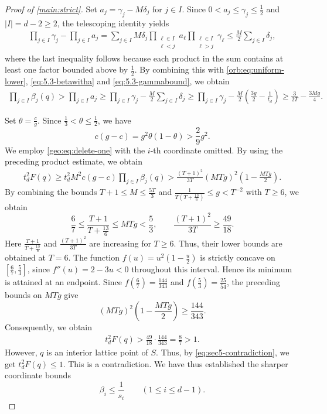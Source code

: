 \documentclass[reqno, 11pt]{article}
\numberwithin{equation}{section}
\theoremstyle{definition}
\begin{document}
\begin{proof}[Proof of \cref{main:strict}]
Set $a_j=\gamma_j-M\delta_j$ for $j\in I$. Since $0<a_j\le\gamma_j\le\frac12$ and $|I|=d-2\ge2$, the telescoping identity yields
\[
\begin{aligned}
\prod_{j\in I}\gamma_j-\prod_{j\in I}a_j=\sum_{j\in I}M\delta_j
\prod_{\substack{\ell\in I\\\ell<j}}a_\ell
\prod_{\substack{\ell\in I\\\ell>j}}\gamma_\ell\le\frac M2\sum_{j\in I}\delta_j,
\end{aligned}
\]
where the last inequality follows because each product in the sum contains at least one factor bounded above by $\frac12$. 
By combining this with \eqref{orb:eq:uniform-lower}, \eqref{eq:5.3-betawitha} and \eqref{eq:5.3-gammabound}, we obtain
\[
\begin{aligned}
\prod_{j\in I}\beta_j(q)>\prod_{j\in I}a_j\ge\prod_{j\in I}\gamma_j-\frac M2\sum_{j\in I}\delta_j
\ge\prod_{j\in I}\gamma_j
-\frac M2\left(\frac{3g}{2}-\frac1{t_d}\right)
\ge\frac3{2T}-\frac{3Mg}{4}.
\end{aligned}
\]

Set $\theta=\frac{c}{g}$. Since $\frac13<\theta\le\frac12$, we have
\[
c(g-c)=g^2\theta(1-\theta)>\frac29g^2.
\]
We employ \eqref{geo:eq:delete-one} with the $i$-th coordinate omitted. By using the preceding product estimate, we obtain
\[
\begin{aligned}
 t_d^2F(q)
 \ge t_d^2M^2c(g-c)
          \prod_{j\in I}\beta_j(q)
 >\frac{(T+1)^2}{3T}(MTg)^2\left(1-\frac{MTg}{2}\right).
\end{aligned}
\]
By combining the bounds $T+1\le M\le\frac{5T}{3}$ and $\frac{1}{T(T+\frac{13}{6})}\le g<T^{-2}$ with $T\ge6$, we obtain
\[
\frac67\le\frac{T+1}{T+\frac{13}{6}}\le MTg<\frac53,\qquad \frac{(T+1)^2}{3T}\ge \frac{49}{18}.
\]
Here $\frac{T+1}{T+\frac{13}{6}}$ and $\frac{(T+1)^2}{3T}$ are increasing for
$T\ge6$. Thus, their lower bounds are obtained at $T=6$. The function $f(u)=u^2(1-\frac{u}{2})$ is strictly concave on $[\frac67,\frac53]$, since $f''(u)=2-3u<0$ throughout this interval. Hence its minimum is attained at an endpoint. Since $f(\frac67)=\frac{144}{343}$ and $f(\frac53)=\frac{25}{54}$,
the preceding bounds on $MTg$ give
\[
(MTg)^2\left(1-\frac{MTg}{2}\right)
\ge\frac{144}{343}.
\]
Consequently, we obtain
\[
\begin{aligned}
t_d^2F(q)>\frac{49}{18}\cdot\frac{144}{343}
=\frac87>1.
\end{aligned}
\]
However, $q$ is an interior lattice point of $S$. Thus, by \eqref{eq:sec5-contradiction}, we get $t_d^2F(q)\le1$.
This is a contradiction. We have thus established the sharper coordinate bounds
\[
\beta_i\le\frac1{s_i}\qquad(1\le i\le d-1).
\]


\end{proof}
\end{document}

